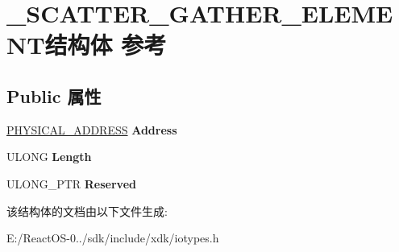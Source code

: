 \hypertarget{struct___s_c_a_t_t_e_r___g_a_t_h_e_r___e_l_e_m_e_n_t}{}\section{\+\_\+\+S\+C\+A\+T\+T\+E\+R\+\_\+\+G\+A\+T\+H\+E\+R\+\_\+\+E\+L\+E\+M\+E\+N\+T结构体 参考}
\label{struct___s_c_a_t_t_e_r___g_a_t_h_e_r___e_l_e_m_e_n_t}
\subsection*{Public 属性}
\begin{DoxyCompactItemize}
\item 
\mbox{\label{struct___s_c_a_t_t_e_r___g_a_t_h_e_r___e_l_e_m_e_n_t_ab7b8545446c244f374997df0d85dfcdb}} 
\hyperlink{union___l_a_r_g_e___i_n_t_e_g_e_r}{P\+H\+Y\+S\+I\+C\+A\+L\+\_\+\+A\+D\+D\+R\+E\+SS} {\bfseries Address}
\item 
\mbox{\label{struct___s_c_a_t_t_e_r___g_a_t_h_e_r___e_l_e_m_e_n_t_a353209b3d25e491a9d503cc2081d6060}} 
U\+L\+O\+NG {\bfseries Length}
\item 
\mbox{\label{struct___s_c_a_t_t_e_r___g_a_t_h_e_r___e_l_e_m_e_n_t_a12bc514fd65f12ee53d2267ae394cd4a}} 
U\+L\+O\+N\+G\+\_\+\+P\+TR {\bfseries Reserved}
\end{DoxyCompactItemize}


该结构体的文档由以下文件生成\+:\begin{DoxyCompactItemize}
\item 
E\+:/\+React\+O\+S-\/0../sdk/include/xdk/iotypes.\+h\end{DoxyCompactItemize}
